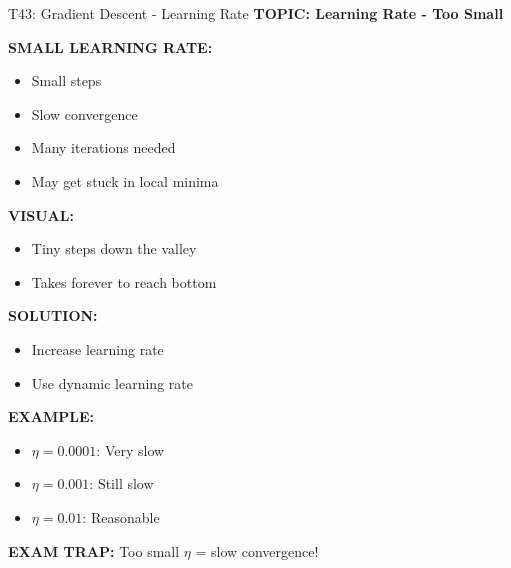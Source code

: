 \documentclass[8pt]{beamer}
\begin{document}
	\begin{frame}{T43: Gradient Descent - Learning Rate}
		\fontsize{6.5}{7.5}\selectfont
		\textbf{TOPIC: Learning Rate - Too Small}
		
		\vspace{0.1cm}
		\textbf{SMALL LEARNING RATE:}
		\begin{itemize}
			\item Small steps
			\item Slow convergence
			\item Many iterations needed
			\item May get stuck in local minima
		\end{itemize}
		
		\vspace{0.1cm}
		\textbf{VISUAL:}
		\begin{itemize}
			\item Tiny steps down the valley
			\item Takes forever to reach bottom
		\end{itemize}
		
		\vspace{0.1cm}
		\textbf{SOLUTION:}
		\begin{itemize}
			\item Increase learning rate
			\item Use dynamic learning rate
		\end{itemize}
		
		\vspace{0.1cm}
		\textbf{EXAMPLE:}
		\begin{itemize}
			\item $\eta = 0.0001$: Very slow
			\item $\eta = 0.001$: Still slow
			\item $\eta = 0.01$: Reasonable
		\end{itemize}
		
		\textcolor{myred}{\textbf{EXAM TRAP:}} Too small $\eta$ = \textcolor{myblue}{slow convergence}!
	\end{frame}
	
\end{document}

